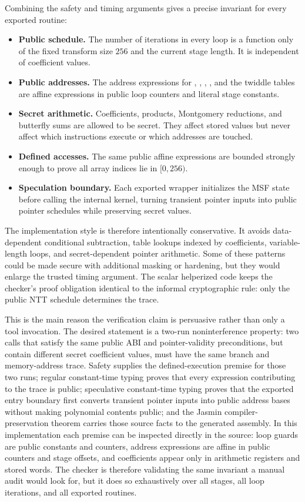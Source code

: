Combining the safety and timing arguments gives a precise invariant for every
exported routine:
\begin{itemize}
  \item \textbf{Public schedule.}  The number of iterations in every loop is a
        function only of the fixed transform size \(256\) and the current
        stage length.  It is independent of coefficient values.
  \item \textbf{Public addresses.}  The address expressions for
        , , , , and
        the twiddle tables are affine expressions in public loop counters and
        literal stage constants.
  \item \textbf{Secret arithmetic.}  Coefficients, products, Montgomery
        reductions, and butterfly sums are allowed to be secret.  They affect
        stored values but never affect which instructions execute or which
        addresses are touched.
  \item \textbf{Defined accesses.}  The same public affine expressions are
        bounded strongly enough to prove all array indices lie in
        \([0,256)\).
  \item \textbf{Speculation boundary.}  Each exported wrapper initializes the
        MSF state before calling the internal kernel, turning transient pointer
        inputs into public pointer schedules while preserving secret values.
\end{itemize}

The implementation style is therefore intentionally conservative.  It avoids
data-dependent conditional subtraction, table lookups indexed by coefficients,
variable-length loops, and secret-dependent pointer arithmetic.  Some of these
patterns could be made secure with additional masking or hardening, but they
would enlarge the trusted timing argument.  The scalar helperized code keeps
the checker's proof obligation identical to the informal cryptographic rule:
only the public NTT schedule determines the trace.

This is the main reason the verification claim is persuasive rather than only
a tool invocation.  The desired statement is a two-run noninterference
property: two calls that satisfy the same public ABI and pointer-validity
preconditions, but contain different secret coefficient values, must have the
same branch and memory-address trace.  Safety supplies the defined-execution
premise for those two runs; regular constant-time typing proves that every
expression contributing to the trace is public; speculative constant-time
typing proves that the exported entry boundary first converts transient pointer
inputs into public address bases without making polynomial contents public;
and the Jasmin compiler-preservation theorem carries those source facts to
the generated assembly.  In this implementation each premise can be inspected
directly in the source: loop guards are public constants and counters, address
expressions are affine in public counters and stage offsets, and coefficients
appear only in arithmetic registers and stored words.  The checker is
therefore validating the same invariant a manual audit would look for, but it
does so exhaustively over all stages, all loop iterations, and all exported
routines.

